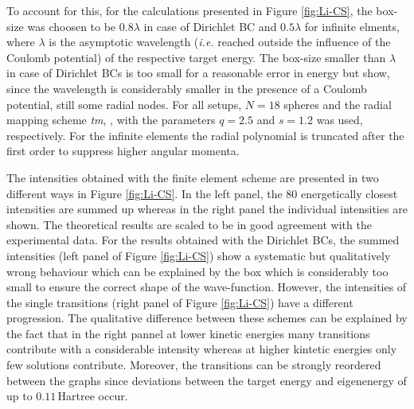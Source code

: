 To account for this, for the calculations presented in Figure \ref{fig:Li-CS}, the box-size was choosen to be $0.8\lambda$ in case of Dirichlet BC and $0.5\lambda$ for infinite elments, where $\lambda$ is the asymptotic wavelength (\textit{i.e.} reached outside the influence of the Coulomb potential) of the respective target energy.
The box-size smaller than $\lambda$ in case of Dirichlet BCs is too small for a reasonable error in energy but show, since the wavelength is considerably smaller in the presence of a Coulomb potential, still some radial nodes.
For all setups, $N=18$ spheres and the radial mapping scheme \textit{tm}, , with the parameters $q=2.5$ and $s=1.2$ was used, respectively.
For the infinite elements the radial polynomial is truncated after the first order to suppress higher angular momenta.

The intensities obtained with the finite element scheme are presented in two different ways in Figure \ref{fig:Li-CS}.
In the left panel, the $80$ energetically closest intensities are summed up whereas in the right panel the individual intensities are shown.
The theoretical results are scaled to be in good agreement with the experimental data.
For the results obtained with the Dirichlet BCs, the summed intensities (left panel of Figure \ref{fig:Li-CS}) show a systematic but qualitatively wrong behaviour which can be explained by the box which is considerably too small to ensure the correct shape of the wave-function.
However, the intensities of the single transitions (right panel of Figure \ref{fig:Li-CS}) have a different progression.
The qualitative difference between these schemes can be explained by the fact that in the right pannel at lower kinetic energies many transitions contribute with a considerable intensity whereas at higher kintetic energies only few solutions contribute.
Moreover, the transitions can be strongly reordered between the graphs since deviations between the target energy and eigenenergy of up to $0.11\,$Hartree occur.

